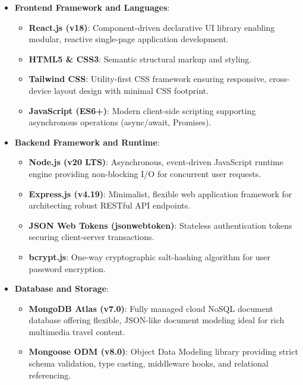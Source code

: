 \documentclass[12pt,a4paper,twoside,openright]{report}
\begin{document}
\begin{itemize}[leftmargin=*]
    \item \textbf{Frontend Framework and Languages}:
    \begin{itemize}
        \item \textbf{React.js (v18)}: Component-driven declarative UI library enabling modular, reactive single-page application development.
        \item \textbf{HTML5 \& CSS3}: Semantic structural markup and styling.
        \item \textbf{Tailwind CSS}: Utility-first CSS framework ensuring responsive, cross-device layout design with minimal CSS footprint.
        \item \textbf{JavaScript (ES6+)}: Modern client-side scripting supporting asynchronous operations (async/await, Promises).
    \end{itemize}

    \item \textbf{Backend Framework and Runtime}:
    \begin{itemize}
        \item \textbf{Node.js (v20 LTS)}: Asynchronous, event-driven JavaScript runtime engine providing non-blocking I/O for concurrent user requests.
        \item \textbf{Express.js (v4.19)}: Minimalist, flexible web application framework for architecting robust RESTful API endpoints.
        \item \textbf{JSON Web Tokens (jsonwebtoken)}: Stateless authentication tokens securing client-server transactions.
        \item \textbf{bcrypt.js}: One-way cryptographic salt-hashing algorithm for user password encryption.
    \end{itemize}

    \item \textbf{Database and Storage}:
    \begin{itemize}
        \item \textbf{MongoDB Atlas (v7.0)}: Fully managed cloud NoSQL document database offering flexible, JSON-like document modeling ideal for rich multimedia travel content.
        \item \textbf{Mongoose ODM (v8.0)}: Object Data Modeling library providing strict schema validation, type casting, middleware hooks, and relational referencing.
    \end{itemize}


\end{itemize}
\end{document}
